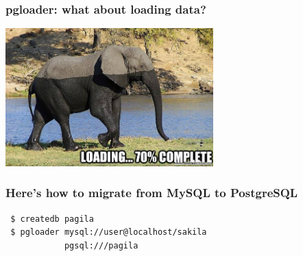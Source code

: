 \documentclass{beamer}
\begin{document}
\begin{frame}
  \frametitle{pgloader: what about loading data?}


  \begin{center}
    \includegraphics[height=2.1in]{elephant-loading.jpg}
  \end{center}
\end{frame}

\begin{frame}[fragile]
  \frametitle{Here's how to migrate from MySQL to PostgreSQL}

  \vfill

\begin{verbatim}
 $ createdb pagila
 $ pgloader mysql://user@localhost/sakila
            pgsql:///pagila
\end{verbatim}
\end{frame}
\end{document}
